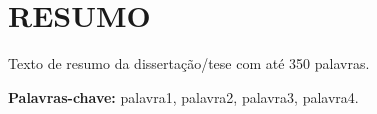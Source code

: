 \chapter*{RESUMO}
\label{resumo}

Texto de resumo da dissertação/tese com até 350 palavras.

\vspace{1cm}

\noindent\textbf{Palavras-chave:} palavra1, palavra2, palavra3, palavra4.

